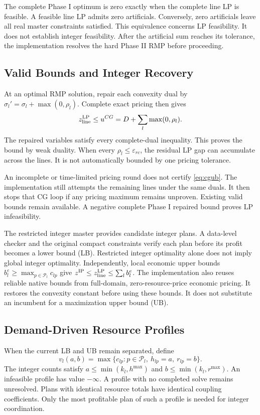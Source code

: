 The complete Phase I optimum is zero exactly when the complete line LP is feasible. A feasible line LP admits zero artificials. Conversely, zero artificials leave all real master constraints satisfied. This equivalence concerns LP feasibility. It does not establish integer feasibility. After the artificial sum reaches its tolerance, the implementation resolves the hard Phase II RMP before proceeding.

\subsection{Valid Bounds and Integer Recovery}
At an optimal RMP solution, repair each convexity dual by $\sigma_l'=\sigma_l+\max(0,\rho_l)$. Complete exact pricing then gives
\begin{equation}
z_{\rm line}^{\mathrm{LP}}\leq u^{CG}=D+\sum_l\max(0,\rho_l).\label{eq:cgub}
\end{equation}
The repaired variables satisfy every complete-dual inequality. This proves the bound by weak duality. When every $\rho_l\leq\varepsilon_{rc}$, the residual LP gap can accumulate across the lines. It is not automatically bounded by one pricing tolerance.

An incomplete or time-limited pricing round does not certify \eqref{eq:cgub}. The implementation still attempts the remaining lines under the same duals. It then stops that CG loop if any pricing maximum remains unproven. Existing valid bounds remain available. A negative complete Phase I repaired bound proves LP infeasibility.

The restricted integer master provides candidate integer plans. A data-level checker and the original compact constraints verify each plan before its profit becomes a lower bound (LB). Restricted integer optimality alone does not imply global integer optimality. Independently, local economic upper bounds $b_l^e\geq\max_{p\in\mathcal P_l}c_{lp}$ give $z^{\mathrm{IP}}\leq z_{\rm line}^{\mathrm{LP}}\leq\sum_l b_l^e$. The implementation also reuses reliable native bounds from full-domain, zero-resource-price economic pricing. It restores the convexity constant before using these bounds. It does not substitute an incumbent for a maximization upper bound (UB).

\subsection{Demand-Driven Resource Profiles}
When the current LB and UB remain separated, define
\begin{equation}
v_l(a,b)=\max\{c_{lp}:p\in\mathcal P_l,\ h_{lp}=a,\ r_{lp}=b\}.\label{eq:profile}
\end{equation}
The integer counts satisfy $a\leq\min(k_l,h^{\max})$ and $b\leq\min(k_l,r^{\max})$. An infeasible profile has value $-\infty$. A profile with no completed solve remains unresolved. Plans with identical resource totals have identical coupling coefficients. Only the most profitable plan of such a profile is needed for integer coordination.

